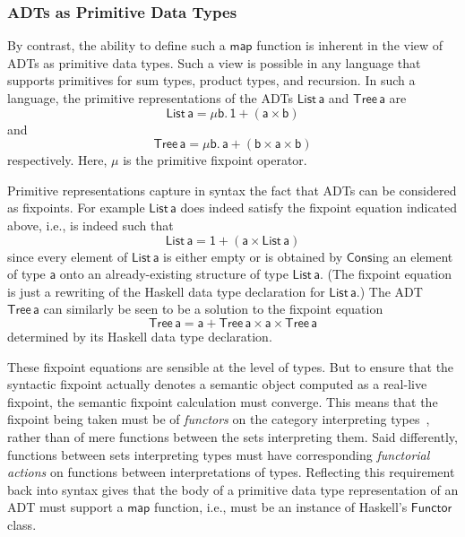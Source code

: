 \documentclass[acmsmall,screen,review,anonymous]{acmart}
\theoremstyle{definition}
\begin{document}
\subsubsection{ADTs as Primitive Data Types}

By contrast, the ability to define such a $\mathsf{map}$ function is
inherent in the view of ADTs as primitive data types. Such a view is
possible in any language that supports primitives for sum types,
product types, and recursion. In such a language, the primitive
representations of the ADTs $\mathsf{List\,a}$ and $\mathsf{Tree\,a}$
are
\[\mathsf{List\,a} = \mathsf{\mu b.\, 1 + (a \times b)}\] 
and 
\[\mathsf{Tree\,a} = \mathsf{\mu b.\, a + (b \times a \times b)}\]
respectively. Here, $\mathsf{\mu}$ is the primitive fixpoint
operator.

Primitive representations capture in syntax the fact that ADTs can be
considered as fixpoints. For example $\mathsf{List\,a}$ does indeed
satisfy the fixpoint equation indicated above, i.e., is indeed such
that
\[\mathsf{List\,a} = \mathsf{1 + (a \times List\,a)}\] 
since every element of $\mathsf{List\,a}$ is either empty or is
obtained by $\mathsf{Cons}$ing an element of type $\mathsf{a}$ onto an
already-existing structure of type $\mathsf{List\,a}$. (The fixpoint
equation is just a rewriting of the Haskell data type declaration for
$\mathsf{List\,a}$.) The ADT $\mathsf{Tree\,a}$ can similarly be seen
to be a solution to the fixpoint equation
\[\mathsf{Tree\,a} = \mathsf{a + Tree\,a \times a \times Tree\,a}\] 
determined by its Haskell data type declaration.

These fixpoint equations are sensible at the level of types. But to
ensure that the syntactic fixpoint actually denotes a semantic object
computed as a real-live fixpoint, the semantic fixpoint calculation
must converge. This means that the fixpoint being taken must be of
{\em functors} on the category interpreting types~\cite{tfca}, rather
than of mere functions between the sets interpreting them. Said
differently, functions between sets interpreting types must have
corresponding {\em functorial actions} on functions between
interpretations of types. Reflecting this requirement back into syntax
gives that the body of a primitive data type representation of an ADT
must support a $\mathsf{map}$ function, i.e., must be an instance of
Haskell's $\mathsf{Functor}$ class.
\end{document}
